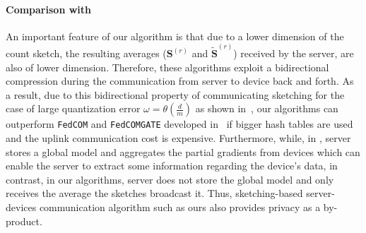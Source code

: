 \documentclass[twoside]{article}
\begin{document}
\paragraph{Comparison  with~\cite{haddadpour2020federated}}\label{rmrk:bidirect}
An important feature of our algorithm is that due to a lower dimension of the count sketch, the resulting averages ($\mathbf{S}^{(r)}$ and  $\tilde{\mathbf{S}}^{(r)}$) received by the server, are also of lower dimension. 
Therefore, these algorithms exploit a bidirectional compression during the communication from server to device back and forth. 
As a result, due to this bidirectional property of communicating sketching for the case of large quantization error $\omega=\theta(\frac{d}{m})$ as shown in~\cite{haddadpour2020federated}, our algorithms can outperform \texttt{FedCOM} and \texttt{FedCOMGATE} developed in~\cite{haddadpour2020federated} if bigger hash tables are used and the uplink communication cost is expensive. 
Furthermore, while, in \cite{haddadpour2019convergence}, server stores a global model and aggregates the partial gradients from devices which can enable the server to extract some information regarding the device's data, in contrast, in our algorithms, server does not store the global model and only receives the average the sketches broadcast it. 
Thus, sketching-based server-devices communication algorithm such as ours also provides privacy as a by-product.
\end{document}
